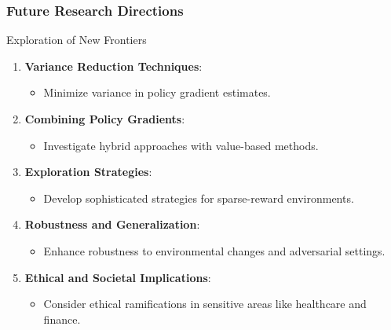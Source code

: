 \documentclass[aspectratio=169]{beamer}
\begin{document}
\begin{frame}[fragile]
    \frametitle{Future Research Directions}
    \begin{block}{Exploration of New Frontiers}
        \begin{enumerate}
            \item \textbf{Variance Reduction Techniques}:
                \begin{itemize}
                    \item Minimize variance in policy gradient estimates.
                \end{itemize}
            \item \textbf{Combining Policy Gradients}:
                \begin{itemize}
                    \item Investigate hybrid approaches with value-based methods.
                \end{itemize}
            \item \textbf{Exploration Strategies}:
                \begin{itemize}
                    \item Develop sophisticated strategies for sparse-reward environments.
                \end{itemize}
            \item \textbf{Robustness and Generalization}:
                \begin{itemize}
                    \item Enhance robustness to environmental changes and adversarial settings.
                \end{itemize}
            \item \textbf{Ethical and Societal Implications}:
                \begin{itemize}
                    \item Consider ethical ramifications in sensitive areas like healthcare and finance.
                \end{itemize}
        \end{enumerate}
    \end{block}
\end{frame}
\end{document}
